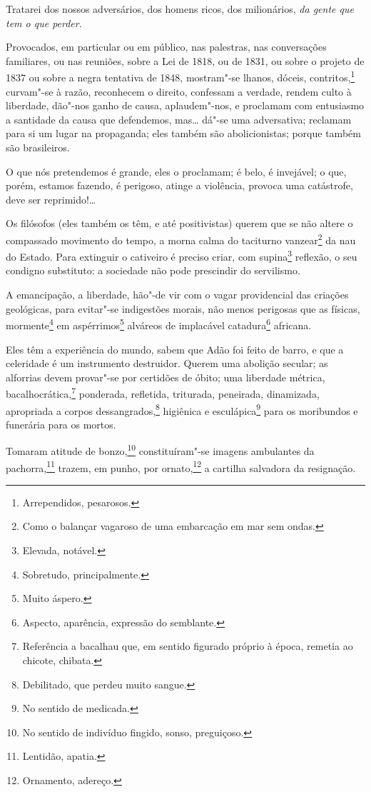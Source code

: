 Tratarei dos nossos adversários, dos homens ricos, dos milionários,
\emph{da gente que tem o que perder}.

Provocados, em particular ou em público, nas palestras, nas conversações
familiares, ou nas reuniões, sobre a Lei de 1818, ou de 1831, ou sobre o
projeto de 1837 ou sobre a negra tentativa de 1848, mostram"-se lhanos,
dóceis, contritos,\footnote{Arrependidos, pesarosos.} curvam"-se à
razão, reconhecem o direito, confessam a verdade, rendem culto à
liberdade, dão"-nos ganho de causa, aplaudem"-nos, e proclamam com
entusiasmo a santidade da causa que defendemos, mas\ldots{} dá"-se uma
adversativa; reclamam para si um lugar na propaganda; eles também são
abolicionistas; porque também são brasileiros.

O que nós pretendemos é grande, eles o proclamam; é belo, é invejável; o
que, porém, estamos fazendo, é perigoso, atinge a violência, provoca uma
catástrofe, deve ser reprimido!\ldots{}

Os filósofos (eles também os têm, e até positivistas) querem que se não
altere o compassado movimento do tempo, a morna calma do taciturno
vanzear\footnote{Como o balançar vagaroso de uma embarcação em mar sem
  ondas.} da nau do Estado. Para extinguir o cativeiro é preciso criar,
com supina\footnote{Elevada, notável.} reflexão, o seu condigno
substituto: a sociedade não pode prescindir do servilismo.

A emancipação, a liberdade, hão"-de vir com o vagar providencial das
criações geológicas, para evitar"-se indigestões morais, não menos
perigosas que as físicas, mormente\footnote{Sobretudo, principalmente.}
em aspérrimos\footnote{Muito áspero.} alváreos de implacável
catadura\footnote{Aspecto, aparência, expressão do semblante.}
africana.

Eles têm a experiência do mundo, sabem que Adão foi feito de barro, e
que a celeridade é um instrumento destruidor. Querem uma abolição
secular; as alforrias devem provar"-se por certidões de óbito; uma
liberdade métrica, bacalhocrática,\footnote{Referência a bacalhau que,
  em sentido figurado próprio à época, remetia ao chicote, chibata.}
ponderada, refletida, triturada, peneirada, dinamizada, apropriada a
corpos dessangrados,\footnote{Debilitado, que perdeu muito sangue.}
higiênica e esculápica\footnote{No sentido de medicada.} para os
moribundos e funerária para os mortos.

Tomaram atitude de bonzo,\footnote{No sentido de indivíduo fingido,
  sonso, preguiçoso.} constituíram"-se imagens ambulantes da
pachorra,\footnote{Lentidão, apatia.} trazem, em punho, por
ornato,\footnote{Ornamento, adereço.} a cartilha salvadora da
resignação.

